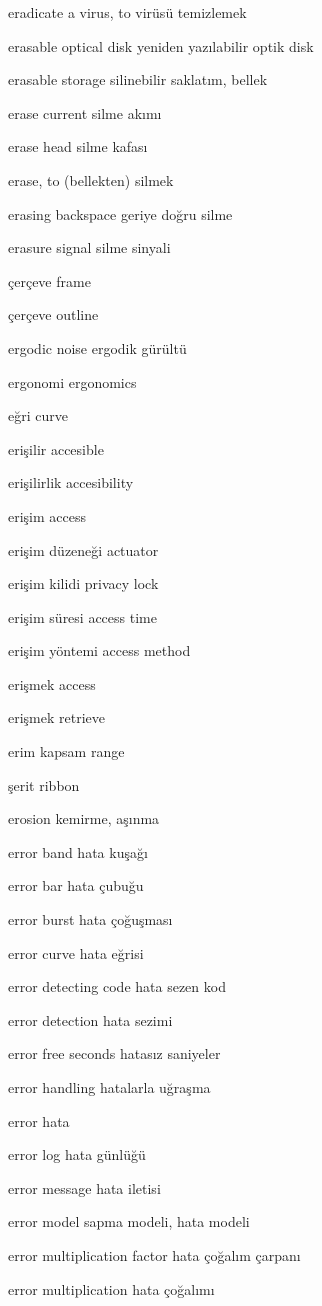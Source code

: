 \documentclass[12pt,fleqn]{article}\usepackage{../../common}
\begin{document}
eradicate a virus, to virüsü temizlemek

erasable optical disk yeniden yazılabilir optik disk

erasable storage silinebilir saklatım, bellek

erase current silme akımı

erase head silme kafası

erase, to (bellekten) silmek

erasing backspace geriye doğru silme

erasure signal silme sinyali

çerçeve frame

çerçeve outline

ergodic noise ergodik gürültü

ergonomi ergonomics

eğri curve

erişilir accesible

erişilirlik accesibility

erişim access

erişim düzeneği actuator

erişim kilidi privacy lock

erişim süresi access time

erişim yöntemi access method

erişmek access

erişmek retrieve

erim kapsam range

şerit ribbon

erosion kemirme, aşınma

error band hata kuşağı

error bar hata çubuğu

error burst hata çoğuşması

error curve hata eğrisi

error detecting code hata sezen kod

error detection hata sezimi

error free seconds hatasız saniyeler

error handling hatalarla uğraşma

error hata

error log hata günlüğü

error message hata iletisi

error model sapma modeli, hata modeli

error multiplication factor hata çoğalım çarpanı

error multiplication hata çoğalımı
\end{document}
